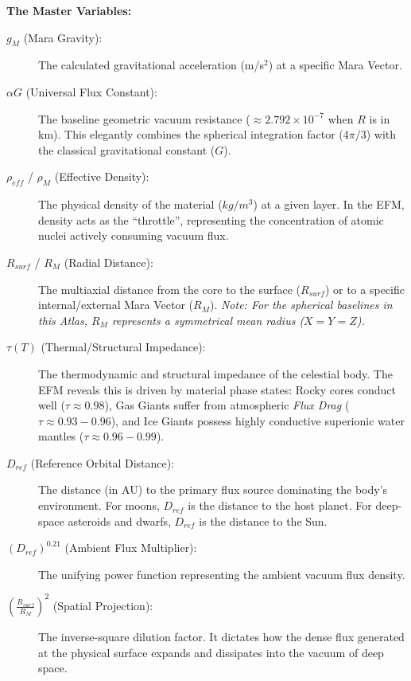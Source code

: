 \documentclass[11pt, a4paper]{article}
\begin{document}
\vspace{0.5em}
\noindent \textbf{The Master Variables:}
\begin{description}
  \item[$g_M$ (Mara Gravity):] The calculated gravitational acceleration (m/s$^2$) at a specific Mara Vector. 
  \item[$\alpha G$ (Universal Flux Constant):] The baseline geometric vacuum resistance ($\approx 2.792 \times 10^{-7}$ when $R$ is in km). This elegantly combines the spherical integration factor ($4\pi/3$) with the classical gravitational constant ($G$).
  \item[$\rho_{eff}$ / $\rho_M$ (Effective Density):] The physical density of the material ($kg/m^3$) at a given layer. In the EFM, density acts as the ``throttle'', representing the concentration of atomic nuclei actively consuming vacuum flux.
  \item[$R_{surf}$ / $R_M$ (Radial Distance):] The multiaxial distance from the core to the surface ($R_{surf}$) or to a specific internal/external Mara Vector ($R_M$). \textit{Note: For the spherical baselines in this Atlas, $R_M$ represents a symmetrical mean radius ($X=Y=Z$).}
  \item[$\tau(T)$ (Thermal/Structural Impedance):] The thermodynamic and structural impedance of the celestial body. The EFM reveals this is driven by material phase states: Rocky cores conduct well ($\tau \approx 0.98$), Gas Giants suffer from atmospheric \textit{Flux Drag} ($\tau \approx 0.93 - 0.96$), and Ice Giants possess highly conductive superionic water mantles ($\tau \approx 0.96 - 0.99$).
  \item[$D_{ref}$ (Reference Orbital Distance):] The distance (in AU) to the primary flux source dominating the body's environment. For moons, $D_{ref}$ is the distance to the host planet. For deep-space asteroids and dwarfs, $D_{ref}$ is the distance to the Sun.
  \item[$(D_{ref})^{0.21}$ (Ambient Flux Multiplier):] The unifying power function representing the ambient vacuum flux density.
  \item[$\left( \frac{R_{surf}}{R_M} \right)^2$ (Spatial Projection):] The inverse-square dilution factor. It dictates how the dense flux generated at the physical surface expands and dissipates into the vacuum of deep space.
\end{description}

\clearpage
\end{document}
